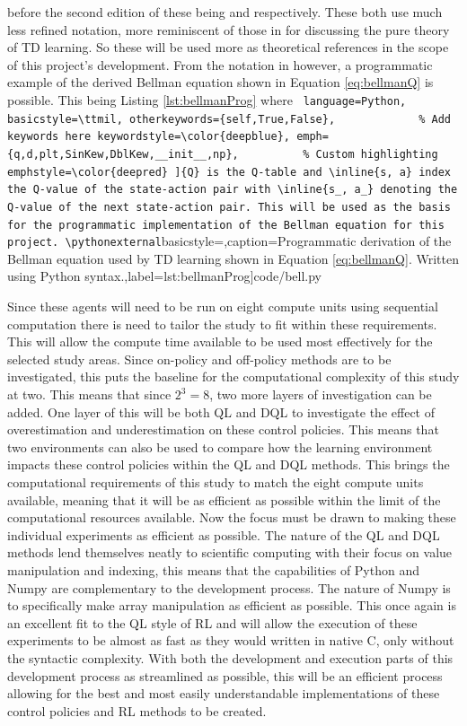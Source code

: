 \documentclass[hidelinks,journal]{IEEEtran}
\newcommand\pythonstyle{\lstset{
language=Python,
basicstyle=\scriptsize\ttm,
otherkeywords={self},             %
keywordstyle=\color{deepblue},
emph={q,d,plt,SinKew,DblKew,__init__,np},          %
emphstyle=\color{deepred},    %
stringstyle=\color{deepgreen},
frame=tb,                         %
numbers=left,
stepnumber=5,
numberfirstline=false,
numbersep=3pt,
captionpos=b,
extendedchars=true,
firstnumber=1,
numberstyle=\tiny\color{mygray},
showstringspaces=false
}}
\newcommand\pythonexternal[2][]{{
\pythonstyle
}}
\def\inline{\lstinline[
language=Python,
basicstyle=\ttmil,
otherkeywords={self,True,False},             %
keywordstyle=\color{deepblue},
emph={q,d,plt,SinKew,DblKew,__init__,np},          %
emphstyle=\color{deepred}
]}
\begin{document}
before the second edition of \textcite{Sutton18} these being \textcite{Watkins89} and \textcite{Rummery94} respectively. These both use much less refined notation, more reminiscent of those in \textcite{Sutton87} for discussing the pure theory of TD learning. So these will be used more as theoretical references in the scope of this project’s development. From the notation in \textcite{Sutton18} however, a programmatic example of the derived Bellman equation shown in Equation \ref{eq:bellmanQ} is possible. This being Listing \ref{lst:bellmanProg} where \inline{Q} is the Q-table and \inline{s, a} index the Q-value of the state-action pair with \inline{s_, a_} denoting the Q-value of the next state-action pair. This will be used as the basis for the programmatic implementation of the Bellman equation for this project.
\pythonexternal[basicstyle=\ttmf,caption=Programmatic derivation of the Bellman equation used by TD learning shown in Equation \ref{eq:bellmanQ}. Written using Python syntax.,label={lst:bellmanProg}]{code/bell.py}

Since these agents will need to be run on eight compute units using sequential computation there is need to tailor the study to fit within these requirements. This will allow the compute time available to be used most effectively for the selected study areas. Since on-policy and off-policy methods are to be investigated, this puts the baseline for the computational complexity of this study at two. This means that since $2^3 = 8$, two more layers of investigation can be added. One layer of this will be both QL and DQL to investigate the effect of overestimation and underestimation on these control policies. This means that two environments can also be used to compare how the learning environment impacts these control policies within the QL and DQL methods. This brings the computational requirements of this study to match the eight compute units available, meaning that it will be as efficient as possible within the limit of the computational resources available. Now the focus must be drawn to making these individual experiments as efficient as possible. The nature of the QL and DQL methods lend themselves neatly to scientific computing with their focus on value manipulation and indexing, this means that the capabilities of Python and Numpy are complementary to the development process. The nature of Numpy is to specifically make array manipulation as efficient as possible. This once again is an excellent fit to the QL style of RL and will allow the execution of these experiments to be almost as fast as they would written in native C, only without the syntactic complexity. With both the development and execution parts of this development process as streamlined as possible, this will be an efficient process allowing for the best and most easily understandable implementations of these control policies and RL methods to be created.
\end{document}
